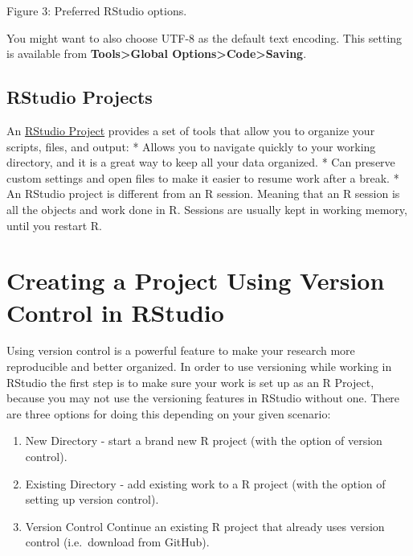 \documentclass[
]{article}
\providecommand{\tightlist}{%
  \setlength{\itemsep}{0pt}\setlength{\parskip}{0pt}}
\begin{document}
Figure 3: Preferred RStudio options.

You might want to also choose UTF-8 as the default text encoding. This
setting is available from \textbf{Tools\textgreater Global
Options\textgreater Code\textgreater Saving}.

\hypertarget{rstudio-projects}{%
\subsection{RStudio Projects}\label{rstudio-projects}}

An
\href{https://support.rstudio.com/hc/en-us/articles/200526207-Using-Projects}{RStudio
Project} provides a set of tools that allow you to organize your
scripts, files, and output: * Allows you to navigate quickly to your
working directory, and it is a great way to keep all your data
organized. * Can preserve custom settings and open files to make it
easier to resume work after a break. * An RStudio project is different
from an R session. Meaning that an R session is all the objects and work
done in R. Sessions are usually kept in working memory, until you
restart R.

\hypertarget{section}{%
\subsection{}\label{section}}

\hypertarget{creating-a-project-using-version-control-in-rstudio}{%
\section{Creating a Project Using Version Control in
RStudio}\label{creating-a-project-using-version-control-in-rstudio}}

Using version control is a powerful feature to make your research more
reproducible and better organized. In order to use versioning while
working in RStudio the first step is to make sure your work is set up as
an R Project, because you may not use the versioning features in RStudio
without one. There are three options for doing this depending on your
given scenario:

\begin{enumerate}
\def\labelenumi{\arabic{enumi}.}
\tightlist
\item
  New Directory - start a brand new R project (with the option of
  version control).
\item
  Existing Directory - add existing work to a R project (with the option
  of setting up version control).
\item
  Version Control Continue an existing R project that already uses
  version control (i.e.~download from GitHub).
\end{enumerate}
\end{document}
